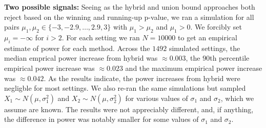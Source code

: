 \documentclass{article}
\begin{document}
\begin{appendix}
\noindent \textbf{Two possible signals: } Seeing as the hybrid and union bound approaches both reject based on the winning and running-up p-value, we ran a simulation for all pairs $\mu_1, \mu_2 \in \{-3, -2.9, \dots, 2.9, 3 \}$ with $\mu_1 > \mu_2$ and $\mu_1 > 0$. We forcibly set $\mu_i = -\infty$ for $i > 2$. For each setting we ran $N=10000$ to get an empirical estimate of power for each method. Across the $1492$ simulated settings, the median emprical power increase from hybrid was $\approx 0.003$, the $90$th percentile empirical power increase was $\approx 0.023$ and the maximum empirical power increase was $\approx 0.042$. As the results indicate, the power increases from hybrid were negligble for most settings. We also re-ran the same simulations but sampled $X_1 \sim N(\mu, \sigma_1^2)$ and $X_2 \sim N(\mu, \sigma_2^2)$ for various values of $\sigma_1$ and $\sigma_2$, which we assume are known. The results were not appreciably different, and, if anything, the difference in power was notably smaller for some values of $\sigma_1$ and $\sigma_2$.  


\end{appendix}
\end{document}
